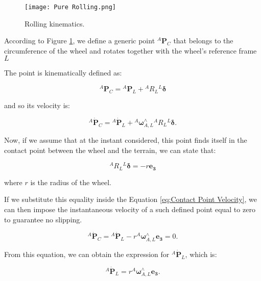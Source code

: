 \begin{figure}
    \centering
    \texttt{[image: Pure Rolling.png]}
    \caption{Rolling kinematics.}
    \label{fig:Rolling kinematics}
\end{figure}

According to Figure \ref{fig:Rolling kinematics}, we define a generic point ${}^{A}\mathbf{P}_C$ that belongs to the circumference of the wheel and rotates together with the wheel's reference frame $L$

The point is kinematically defined as:

\begin{equation}
   {}^{A}\mathbf{P}_C = {}^{A} \mathbf{P}_{L} + {}^{A}R_{L} {}^{L}\bm{\delta} 
    \label{eq:Contact Point Position}
\end{equation}

and so its velocity is:

\begin{equation}
    {}^{A}\dot{\mathbf{P}}_{C} = {}^{A} \dot{\mathbf{P}}_{L} + {}^{A} \bm{\omega}^{\wedge{}}_{A,L} {}^{A}R_{L} {}^{L}\bm{\delta}. 
    \label{eq:Contact Point Velocity}
\end{equation}

Now, if we assume that at the instant considered, this point finds itself in the contact point between the wheel and the terrain, we can state that:

\begin{equation*}
    {}^{A}R_{L} {}^{L}\bm{\delta} = -r \mathbf{e_{3}}
\end{equation*}

where $r$ is the radius of the wheel.

If we substitute this equality inside the Equation \eqref{eq:Contact Point Velocity}, we can then impose the instantaneous velocity of a such defined point equal to zero to guarantee no slipping.

\begin{equation}
{}^{A}\dot{\mathbf{P}}_{C} = {}^{A} \dot{\mathbf{P}}_{L} - r {}^{A} \bm{\omega}^{\wedge{}}_{A,L} \mathbf{e_{3}} = 0.
\label{eq:Rolling velocity constraint}
\end{equation}

From this equation, we can obtain the expression for ${}^{A} \dot{\mathbf{P}}_{L}$, which is: 

\begin{equation}
{}^{A} \dot{\mathbf{P}}_{L} = r {}^{A} \bm{\omega}^{\wedge{}}_{A,L} \mathbf{e_{3}}.
\end{equation}

